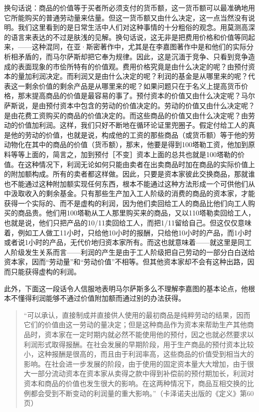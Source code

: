 换句话说：商品的价值等于买者所必须支付的货币额，这一货币额可以最准确地用它所能购买的普通劳动量来估量。但这一货币额又由什么决定，这一点当然没有说明。我们这里看到的是日常生活中人们对这种事情的十分粗俗的观念。用莫测高深的语言来表达的不过是肤浅的见解。换句话说，这无非是把费用价格和价值等同起来，——这种混同，在亚·斯密著作中，尤其是在李嘉图著作中是和他们的实际分析相矛盾的，而马尔萨斯却把它奉为规律。因此，这是沉湎于竞争、只看到竞争造成的表面现象的市侩所特有的价值观。费用价格究竟是由什么决定的呢？由预付资本的量加利润决定。而利润又是由什么决定的呢？利润的基金是从哪里来的呢？代表这一剩余价值的剩余产品是从哪里来的呢？如果问题只在于名义上提高货币价格，那末提高商品的价值是最容易的事了。预付资本的价值又由什么决定呢？马尔萨斯说，是由预付资本中包含的劳动的价值决定的。劳动的价值又由什么决定呢？是由花费工资购买的商品的价值决定的。而这些商品的价值又由什么决定呢？由劳动的价值加利润。这样，我们只好不断地在循环论证里兜圈子。假定付给工人的真是他的劳动的价值，也就是说，构成他的工资的那些商品（或货币额）等于他的劳动物化在其中的商品的价值（货币额），那末，他要是得到100塔勒工资，他加到原料等等上面的，简言之，加到预付［不变］资本上面的总共也就是100塔勒的价值。在这种情况下，利润无论如何只能由卖者在出卖商品时加在商品的实际价值上的附加额构成。所有的卖者都这样做。因此，只要是资本家彼此交换商品，那就谁也不能通过这种附加额实现任何东西，根本不能通过这种方法形成一个可供他们从中汲取收入的剩余基金。只有那些生产加入工人阶级的消费的商品的资本家，才能获得一个实际的、而不是虚构的利润，因为他们卖回给工人的商品比他们向工人购买的商品贵。他们用100塔勒从工人那里购买来的商品，又以110塔勒卖回给工人，也就是说，他们只把产品的10/11卖回给工人，而把1/11留给自己。但这仅仅意味着，例如工人做工11小时，只给他10小时的报酬，只给他10小时的产品，而1小时或者说1小时的产品，无代价地归资本家所有。而这也就意味着——就这里是同工人阶级发生关系而言——利润的产生是由于工人阶级把自己劳动的一部分白白送给资本家，因而“劳动量”和“劳动价值”不相等。但其他资本家却不会有这种出路，因而只能获得虚构的利润。

此外，下面这一段话令人信服地表明马尔萨斯多么不理解李嘉图的基本论点，他根本不懂得利润能够不通过价值附加额而通过别的办法获得。

\begin{quote}{“可以承认，直接制成并直接供人使用的最初商品是纯粹劳动的结果，因而它们的价值由这一劳动的量决定；但是这种商品作为资本来帮助生产其他商品时，资本家在一定时期内就必然不能使用他的预付，因之也就必然要求以利润形式取得报酬。在社会发展的早期阶段，用于生产商品的预付资本比较小，这种报酬是很高的，而且由于利润率高，这些商品的价值受到相当大的影响。在社会进一步发展的阶段，由于使用的固定资本量大大增加，由于很大一部分流动资本在资本家从卖得之款中得到补偿前的预付期加长，利润对资本和商品的价值也发生很大的影响。在这两种情况下，商品互相交换的比例都会受到不断变动的利润量的重大影响。”（卡泽诺夫出版的《定义》第60页）}\end{quote}

